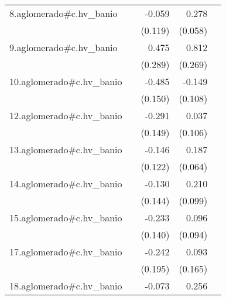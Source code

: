 {\begin{longtable}{l*{4}{D{.}{.}{-1}}}
\addlinespace
8.aglomerado#c.hv\_banio&                     &      -0.059         &       0.278\sym{***}&                     \\
            &                     &     (0.119)         &     (0.058)         &                     \\
\addlinespace
9.aglomerado#c.hv\_banio&                     &       0.475         &       0.812\sym{**} &                     \\
            &                     &     (0.289)         &     (0.269)         &                     \\
\addlinespace
10.aglomerado#c.hv\_banio&                     &      -0.485\sym{**} &      -0.149         &                     \\
            &                     &     (0.150)         &     (0.108)         &                     \\
\addlinespace
12.aglomerado#c.hv\_banio&                     &      -0.291         &       0.037         &                     \\
            &                     &     (0.149)         &     (0.106)         &                     \\
\addlinespace
13.aglomerado#c.hv\_banio&                     &      -0.146         &       0.187\sym{**} &                     \\
            &                     &     (0.122)         &     (0.064)         &                     \\
\addlinespace
14.aglomerado#c.hv\_banio&                     &      -0.130         &       0.210\sym{*}  &                     \\
            &                     &     (0.144)         &     (0.099)         &                     \\
\addlinespace
15.aglomerado#c.hv\_banio&                     &      -0.233         &       0.096         &                     \\
            &                     &     (0.140)         &     (0.094)         &                     \\
\addlinespace
17.aglomerado#c.hv\_banio&                     &      -0.242         &       0.093         &                     \\
            &                     &     (0.195)         &     (0.165)         &                     \\
\addlinespace
18.aglomerado#c.hv\_banio&                     &      -0.073         &       0.256\sym{***}&                     \\

\end{longtable}}

